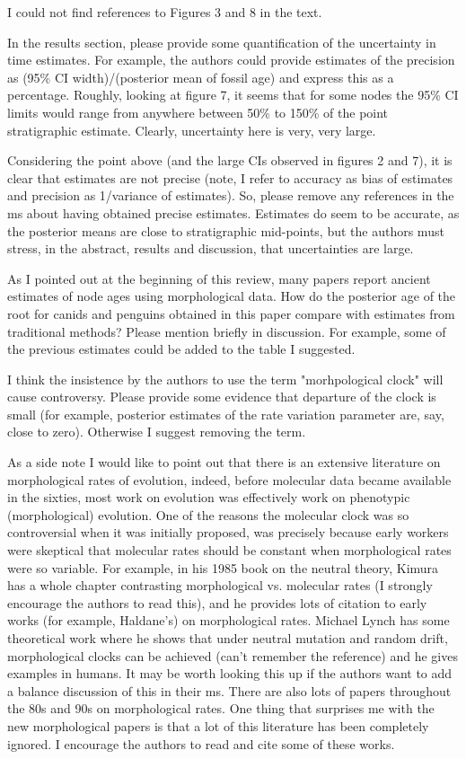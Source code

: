 \documentclass[11pt]{article}
\begin{document}
I could not find references to Figures 3 and 8 in the text.

In the results section, please provide some quantification of the uncertainty in time estimates. For example,  the authors could provide estimates of the precision as (95\% CI width)/(posterior mean of fossil age) and express this as a percentage. Roughly, looking at figure 7, it seems that for some nodes the 95\% CI limits would range from anywhere between 50\% to 150\% of the point stratigraphic estimate. Clearly, uncertainty here is very, very large. 

Considering the point above (and the large CIs observed in figures 2 and 7), it is clear that estimates are not precise (note, I refer to accuracy as bias of estimates and precision as 1/variance of estimates). So, please remove any references in the ms about having obtained precise estimates. Estimates do seem to be accurate, as the posterior means are close to stratigraphic mid-points, but the authors must stress, in the abstract, results and discussion, that uncertainties are large.

As I pointed out at the beginning of this review, many papers report ancient estimates of node ages using morphological data. How do the posterior age of the root for canids and penguins obtained in this paper compare with estimates from traditional methods? Please mention briefly in discussion. For example, some of the previous estimates could be added to the table I suggested.

I think the insistence by the authors to use the term "morhpological clock" will cause controversy. Please provide some evidence that departure of the clock is small (for example, posterior estimates of the rate variation parameter are, say, close to zero). Otherwise I suggest removing the term.

As a side note I would like to point out that there is an extensive literature on morphological rates of evolution, indeed, before molecular data became available in the sixties, most work on evolution was effectively work on phenotypic (morphological) evolution. One of the reasons the molecular clock was so controversial when it was initially proposed, was precisely because early workers were skeptical that molecular rates should be constant when morphological rates were so variable. For example, in his 1985 book on the neutral theory, Kimura has a whole chapter contrasting morphological vs. molecular rates (I strongly encourage the authors to read this), and he provides lots of citation to early works (for example, Haldane's) on morphological rates. Michael Lynch has some theoretical work where he shows that under neutral mutation and random drift, morphological clocks can be achieved (can't remember the reference) and he gives examples in humans. It may be worth looking this up if the authors want to add a balance discussion of this in their ms. There are also lots of papers throughout the 80s and 90s on morphological rates. One thing that surprises me with the new morphological papers is that a lot of this literature has been completely ignored. I encourage the authors to read and cite some of these works.
\end{document}
